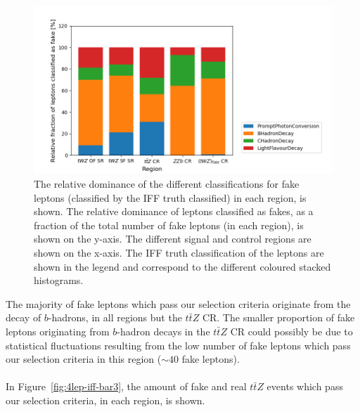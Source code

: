\begin{figure}[htbp]
\centering

    \includegraphics[width=.8\textwidth]{figures/iff_bar_2.png}   

    \caption{The relative dominance of the different classifications for fake leptons (classified by the IFF truth classified) in each region, is shown. The relative dominance of leptons classified as fakes, as a fraction of the total number of fake leptons (in each region), is shown on the y-axis. The different signal and control regions are shown on the x-axis. The IFF truth classification of the leptons are shown in the legend and correspond to the different coloured stacked histograms.}
  \label{fig:4lep-iff-bar2}
\end{figure}
The majority of fake leptons which pass our selection criteria originate from the decay of $b$-hadrons, in all regions but the $t\bar{t}Z$ CR. The smaller proportion of fake leptons originating from $b$-hadron decays in the $t\bar{t}Z$ CR could possibly be due to statistical fluctuations resulting from the low number of fake leptons which pass our selection criteria in this region ($\sim 40$ fake leptons).\\\\

In Figure~\ref{fig:4lep-iff-bar3}, the amount of fake and real $t\bar{t}Z$ events which pass our selection criteria, in each region, is shown.

